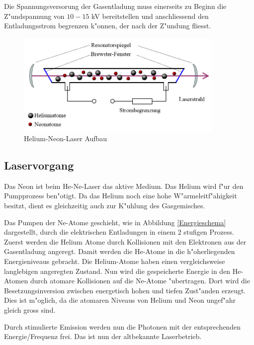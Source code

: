 \begin{refsection}
Die Spannungsversorung der Gasentladung muss einerseits zu Beginn die 
Z"undspannung von $10 - 15$ kV bereitstellen und anschliessend den 
Entladungsstrom begrenzen k"onnen, der nach der Z"undung fliesst.

\begin{figure}
\centering
\includegraphics[width = 10cm]{laser/bilder/Laserschema.png}
\caption{Helium-Neon-Laser Aufbau \cite{He-Ne-Laser-Aufbau}}
\label{HeNeLaserschema}
\end{figure}

\subsection{Laservorgang}
Das Neon ist beim He-Ne-Laser das aktive Medium. Das Helium wird f"ur den 
Pumpprozess ben"otigt. 
Da das Helium noch eine hohe W"armeleitf"ahigkeit besitzt, dient es 
gleichzeitig auch zur K"uhlung des Gasgemisches.

Das Pumpen der Ne-Atome geschieht, wie in Abbildung \ref{Energieschema} 
dargestellt, durch die elektrischen Entladungen in einem 2 stufigen Prozess. 
Zuerst werden die Helium Atome durch Kollisionen mit den Elektronen aus der 
Gasentladung angeregt. Damit werden die He-Atome in die h"oherliegenden 
Energieniveaus gebracht.
Die Helium-Atome haben einen vergleichsweise langlebigen angeregten Zustand. 
Nun wird die gespeicherte Energie in den He-Atomen durch atomare Kollisionen 
auf die Ne-Atome "ubertragen. Dort wird die Besetzungsinversion zwischen 
energetisch hohen und tiefen Zust"anden erzeugt. Dies ist m"oglich, da die 
atomaren Niveaus von Helium und Neon ungef"ahr gleich gross sind.

Durch stimulierte Emission werden nun die Photonen mit der entsprechenden 
Energie/Frequenz frei. Das ist nun der altbekannte Laserbetrieb.


\end{refsection}
